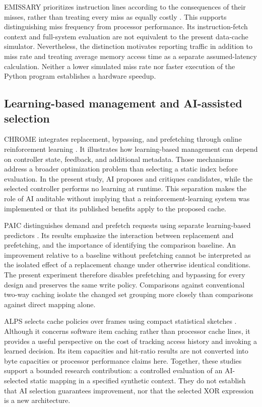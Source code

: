 \documentclass[11pt,a4paper]{article}
\begin{document}
EMISSARY prioritizes instruction lines according to the consequences of their misses, rather than treating every miss as equally costly \cite{nagendra2023}. This supports distinguishing miss frequency from processor performance. Its instruction-fetch context and full-system evaluation are not equivalent to the present data-cache simulator. Nevertheless, the distinction motivates reporting traffic in addition to miss rate and treating average memory access time as a separate assumed-latency calculation. Neither a lower simulated miss rate nor faster execution of the Python program establishes a hardware speedup.

\subsection{Learning-based management and AI-assisted selection}
CHROME integrates replacement, bypassing, and prefetching through online reinforcement learning \cite{lu2024}. It illustrates how learning-based management can depend on controller state, feedback, and additional metadata. Those mechanisms address a broader optimization problem than selecting a static index before evaluation. In the present study, AI proposes and critiques candidates, while the selected controller performs no learning at runtime. This separation makes the role of AI auditable without implying that a reinforcement-learning system was implemented or that its published benefits apply to the proposed cache.

PAIC distinguishes demand and prefetch requests using separate learning-based predictors \cite{yang2023}. Its results emphasize the interaction between replacement and prefetching, and the importance of identifying the comparison baseline. An improvement relative to a baseline without prefetching cannot be interpreted as the isolated effect of a replacement change under otherwise identical conditions. The present experiment therefore disables prefetching and bypassing for every design and preserves the same write policy. Comparisons against conventional two-way caching isolate the changed set grouping more closely than comparisons against direct mapping alone.

ALPS selects cache policies over frames using compact statistical sketches \cite{shahout2024}. Although it concerns software item caching rather than processor cache lines, it provides a useful perspective on the cost of tracking access history and invoking a learned decision. Its item capacities and hit-ratio results are not converted into byte capacities or processor performance claims here. Together, these studies support a bounded research contribution: a controlled evaluation of an AI-selected static mapping in a specified synthetic context. They do not establish that AI selection guarantees improvement, nor that the selected XOR expression is a new architecture.
\end{document}
